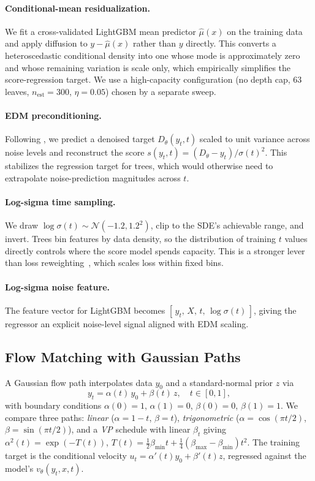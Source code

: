 \documentclass{uai2026}
\newcommand{\Norm}{\mathcal{N}}
\begin{document}
\paragraph{Conditional-mean residualization.} We fit a cross-validated LightGBM mean predictor $\hat{\mu}(x)$ on the training data and apply diffusion to $y - \hat{\mu}(x)$ rather than $y$ directly. This converts a heteroscedastic conditional density into one whose mode is approximately zero and whose remaining variation is scale only, which empirically simplifies the score-regression target. We use a high-capacity configuration (no depth cap, 63 leaves, $n_{\text{est}}{=}300$, $\eta{=}0.05$) chosen by a separate sweep.

\paragraph{EDM preconditioning.} Following \citet{karras2022edm}, we predict a denoised target $D_\theta(y_t, t)$ scaled to unit variance across noise levels and reconstruct the score $s(y_t, t) = (D_\theta - y_t)/\sigma(t)^2$. This stabilizes the regression target for trees, which would otherwise need to extrapolate noise-prediction magnitudes across $t$.

\paragraph{Log-sigma time sampling.} We draw $\log\sigma(t) \sim \Norm(-1.2, 1.2^2)$, clip to the SDE's achievable range, and invert. Trees bin features by data density, so the distribution of training $t$ values directly controls where the score model spends capacity. This is a stronger lever than loss reweighting~\citep{hang2023minsnr}, which scales loss within fixed bins.

\paragraph{Log-sigma noise feature.} The feature vector for LightGBM becomes $[\,y_t,\,X,\,t,\,\log\sigma(t)\,]$, giving the regressor an explicit noise-level signal aligned with EDM scaling.

\subsection{Flow Matching with Gaussian Paths}\label{sec:fm}
A Gaussian flow path interpolates data $y_0$ and a standard-normal prior $z$ via
\begin{equation}\label{eq:path}
y_t = \alpha(t)\, y_0 + \beta(t)\, z, \quad t \in [0,1],
\end{equation}
with boundary conditions $\alpha(0)=1$, $\alpha(1)=0$, $\beta(0)=0$, $\beta(1)=1$. We compare three paths: \emph{linear} ($\alpha = 1-t$, $\beta = t$), \emph{trigonometric} ($\alpha = \cos(\pi t/2)$, $\beta = \sin(\pi t /2)$), and a \emph{VP} schedule with linear $\beta_t$ giving $\alpha^2(t) = \exp(-T(t))$, $T(t) = \tfrac{1}{2}\beta_{\min} t + \tfrac{1}{4}(\beta_{\max} - \beta_{\min}) t^2$. The training target is the conditional velocity $u_t = \alpha'(t) y_0 + \beta'(t) z$, regressed against the model's $v_\theta(y_t, x, t)$.
\end{document}
